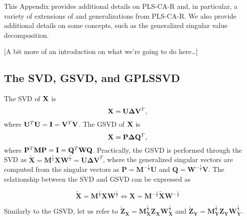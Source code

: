 \documentclass[12pt]{article}
\begin{document}
This Appendix provides additional details on PLS-CA-R and, in
particular, a variety of extensions of and generalizations from
PLS-CA-R. We also provide additional details on some concepts, such as
the generalized singular value decomposition.

{[}A bit more of an introduction on what we're going to do here\ldots{]}

\hypertarget{the-svd-gsvd-and-gplssvd}{%
\subsection{The SVD, GSVD, and GPLSSVD}\label{the-svd-gsvd-and-gplssvd}}

The SVD of \({\bf X}\) is \begin{equation}
{\bf X} = {\bf U}{\boldsymbol \Delta}{\bf V}^{T},
\end{equation} where
\({\bf U}^{T}{\bf U} = {\bf I} = {\bf V}^{T}{\bf V}\). The GSVD of
\({\bf X}\) is \begin{equation}
{\bf X} = {\bf P}{\boldsymbol \Delta}{\bf Q}^{T},
\end{equation} where
\({\bf P}^{T}{\bf M}{\bf P} = {\bf I} = {\bf Q}^{T}{\bf W}{\bf Q}\).
Practically, the GSVD is performed through the SVD as
\(\widetilde{\mathbf X} = {\mathbf M}^{\frac{1}{2}}{\mathbf X}{\mathbf W}^{\frac{1}{2}} = {\mathbf U} {\boldsymbol \Delta} {\mathbf V}^{T}\),
where the generalized singular vectors are computed from the singular
vectors as \({\mathbf P} = {\mathbf M}^{-\frac{1}{2}}{\mathbf U}\) and
\({\mathbf Q} = {\mathbf W}^{-\frac{1}{2}}{\mathbf V}\). The
relationship between the SVD and GSVD can be expressed as

\begin{equation}
\widetilde{\mathbf X} = {\mathbf M}^{\frac{1}{2}}{\mathbf X}{\mathbf W}^{\frac{1}{2}} \Longleftrightarrow {\mathbf X} = {\mathbf M}^{-\frac{1}{2}}\widetilde{\mathbf X}{\mathbf W}^{-\frac{1}{2}}
\end{equation}

Similarly to the GSVD, let us refer to
\(\widetilde{{\mathbf Z}}_{\mathbf X} = {\mathbf M}_{\mathbf X}^{\frac{1}{2}}{\mathbf Z}_{\mathbf X}{\mathbf W}_{\mathbf X}^{\frac{1}{2}}\)
and
\(\widetilde{{\mathbf Z}}_{\mathbf Y} = {\mathbf M}_{\mathbf Y}^{\frac{1}{2}}{\mathbf Z}_{\mathbf Y}{\mathbf W}_{\mathbf Y}^{\frac{1}{2}}\).
\end{document}
